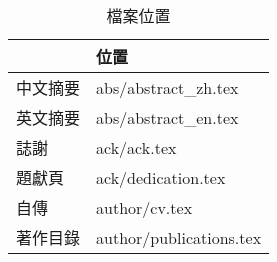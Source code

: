 \begin{table}[h]
\centering
\caption[檔案位置]{檔案位置}
\label{table:pages}
\begin{tabular}{@{}ll@{}}
\toprule
     & 位置                      \\ \midrule
中文摘要 & abs/abstract\_zh.tex    \\
英文摘要 & abs/abstract\_en.tex    \\
誌謝   & ack/ack.tex             \\
題獻頁  & ack/dedication.tex      \\
自傳   & author/cv.tex           \\
著作目錄 & author/publications.tex \\ \bottomrule
\end{tabular}
\end{table}